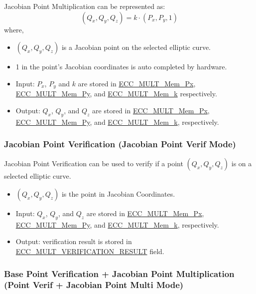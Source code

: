 \documentclass[main\_\_EN.tex]{subfiles}
\begin{document}
Jacobian Point Multiplication can be represented as:
\[
(Q_x,Q_y,Q_z) = k \cdot (P_x,P_y,1)
\]
where,
\begin{itemize}
    \item $(Q_x,Q_y,Q_z)$ is a Jacobian point on the selected elliptic curve.
    \item 1 in the point's Jacobian coordinates is auto completed by hardware.
    \item Input: $P_x$, $P_y$ and $k$ are stored in \hyperref[tab:ecc-memory]{ECC\_MULT\_Mem\_Px}, \hyperref[tab:ecc-memory]{ECC\_MULT\_Mem\_Py}, and \hyperref[tab:ecc-memory]{ECC\_MULT\_Mem\_k} respectively.
    \item Output: $Q_x$, $Q_y$, and $Q_z$ are stored in \hyperref[tab:ecc-memory]{ECC\_MULT\_Mem\_Px}, \hyperref[tab:ecc-memory]{ECC\_MULT\_Mem\_Py}, and \hyperref[tab:ecc-memory]{ECC\_MULT\_Mem\_k}, respectively.
\end{itemize}

\subsubsection{Jacobian Point Verification (Jacobian Point Verif Mode)}

Jacobian Point Verification can be used to verify if a point $(Q_x,Q_y,Q_z)$ is on a selected elliptic curve.
\begin{itemize}
    \item $(Q_x,Q_y,Q_z)$ is the point in Jacobian Coordinates.
    \item Input: $Q_x$, $Q_y$, and $Q_z$ are stored in \hyperref[tab:ecc-memory]{ECC\_MULT\_Mem\_Px}, \hyperref[tab:ecc-memory]{ECC\_MULT\_Mem\_Py}, and \hyperref[tab:ecc-memory]{ECC\_MULT\_Mem\_k}, respectively.
    \item Output: verification result is stored in \hyperref[fielddesc:ECCMULTVERIFICATIONRESULT]{ECC\_MULT\_VERIFICATION\_RESULT} field.
\end{itemize}

\subsubsection{Base Point Verification + Jacobian Point Multiplication (Point Verif + Jacobian Point Multi Mode)}
\end{document}
